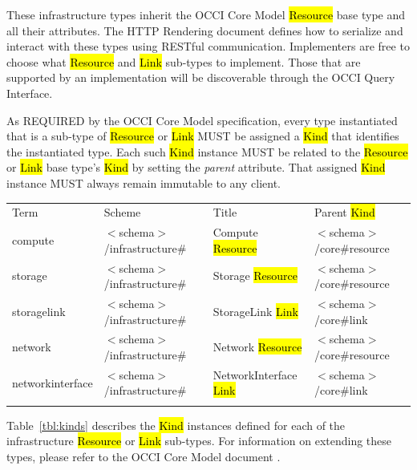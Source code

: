 \documentclass[10pt,a4paper]{article}
\begin{document}
These infrastructure types inherit the OCCI Core Model \hl{Resource}
base type and all their attributes. The HTTP Rendering document
\cite{occi:http_rendering} defines how to serialize and interact with
these types using RESTful communication. Implementers are free to
choose what \hl{Resource} and \hl{Link} sub-types to implement. Those
that are supported by an implementation will be discoverable through
the OCCI Query Interface.

As REQUIRED by the OCCI Core Model specification, every type
instantiated that is a sub-type of \hl{Resource} or \hl{Link} MUST be
assigned a \hl{Kind} that identifies the instantiated type. Each such
\hl{Kind} instance MUST be related to the \hl{Resource} or \hl{Link}
base type's \hl{Kind} by setting the \textit{parent} attribute.
 That assigned \hl{Kind} instance MUST always
remain immutable to any client.

 {
	\begin{tabular}{llll}
	\toprule
	Term & Scheme & Title & Parent \hl{Kind} \\
	\colrule
	compute &  $<$schema$>$/infrastructure\# & Compute \hl{Resource}
	& $<$schema$>$/core\#resource \\

	storage & $<$schema$>$/infrastructure\# & Storage \hl{Resource}
	& $<$schema$>$/core\#resource \\

	storagelink & $<$schema$>$/infrastructure\# & StorageLink \hl{Link}
	& $<$schema$>$/core\#link \\

	network & $<$schema$>$/infrastructure\# & Network \hl{Resource}
	& $<$schema$>$/core\#resource \\

	networkinterface & $<$schema$>$/infrastructure\# & NetworkInterface \hl{Link}
	& $<$schema$>$/core\#link \\

	\botrule
	\end{tabular}
}

Table~\ref{tbl:kinds} describes the \hl{Kind} instances defined for
each of the infrastructure \hl{Resource} or \hl{Link} sub-types. For
information on extending these types, please refer to the OCCI Core
Model document \cite{occi:core}.
\end{document}
